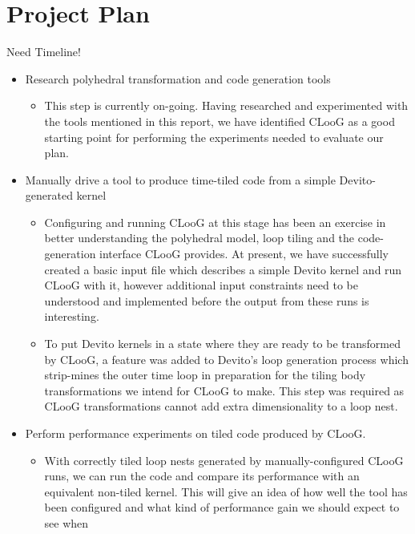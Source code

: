 \documentclass[a4paper,12pt,twoside]{report}
\begin{document}
\chapter{Project Plan}
Need Timeline!
\begin{itemize}
    \item Research polyhedral transformation and code generation tools
        \begin{itemize}
            \item This step is currently on-going. Having researched and experimented with the tools mentioned in
                this report, we have identified CLooG as a good starting point for performing the experiments needed
                to evaluate our plan.
        \end{itemize}
    \item Manually drive a tool to produce time-tiled code from a simple Devito-generated kernel
        \begin{itemize}
            \item Configuring and running CLooG at this stage has been an exercise in better understanding the polyhedral model,
                loop tiling and the code-generation interface CLooG provides. At present, we have successfully created a basic input file
                which describes a simple Devito kernel and run CLooG with it, however additional input constraints need to be understood and implemented
                before the output from these runs is interesting.
            \item To put Devito kernels in a state where they are ready to be transformed by CLooG, a feature was added to Devito's loop generation process
                which strip-mines the outer time loop in preparation for the tiling body transformations we intend for CLooG to make. This step was required as CLooG
                transformations cannot add extra dimensionality to a loop nest.
        \end{itemize}
    \item Perform performance experiments on tiled code produced by CLooG.
        \begin{itemize}
            \item With correctly tiled loop nests generated by manually-configured CLooG runs, we can run the code and compare its performance with an equivalent 
                non-tiled kernel. This will give an idea of how well the tool has been configured and what kind of performance gain we should expect to see when

\end{itemize}
\end{itemize}
\end{document}
